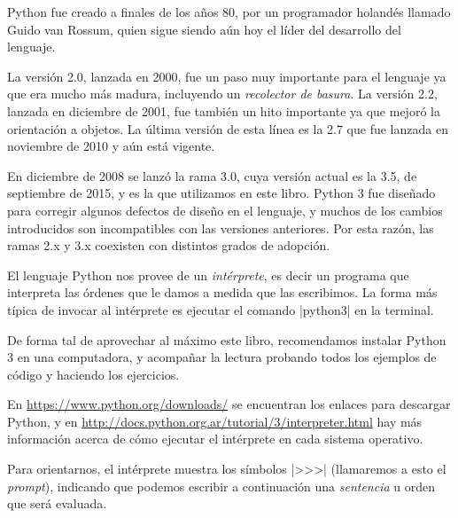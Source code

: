\begin{sabias_que}
Python fue creado a finales de los años 80, por un programador holandés
llamado Guido van Rossum, quien sigue siendo aún hoy el líder del
desarrollo del lenguaje.

La versión 2.0, lanzada en 2000, fue un paso muy importante para el
lenguaje ya que era mucho más madura, incluyendo un \textit{recolector de
basura}.  La versión 2.2, lanzada en diciembre de 2001, fue también un hito
importante ya que mejoró la orientación a objetos.  La última versión de
esta línea es la 2.7 que fue lanzada en noviembre de 2010 y aún está vigente.

En diciembre de 2008 se lanzó la rama 3.0, cuya versión actual es la 3.5, de
septiembre de 2015, y es la que utilizamos en este libro. Python 3 fue diseñado
para corregir algunos defectos de diseño en el lenguaje, y muchos de los
cambios introducidos son incompatibles con las versiones anteriores. Por esta
razón, las ramas 2.x y 3.x coexisten con distintos grados de adopción.
\end{sabias_que}

El lenguaje Python nos provee de un {\it intérprete}, es decir un programa que
interpreta las órdenes que le damos a medida que las escribimos. La forma más
típica de invocar al intérprete es ejecutar el comando |python3| en
la terminal.

\begin{atencion}
De forma tal de aprovechar al máximo este libro, recomendamos instalar Python 3
en una computadora, y acompañar la lectura probando todos los ejemplos de
código y haciendo los ejercicios.

En \url{https://www.python.org/downloads/} se encuentran los enlaces para
descargar Python, y en
\url{http://docs.python.org.ar/tutorial/3/interpreter.html} hay más información
acerca de cómo ejecutar el intérprete en cada sistema operativo.
\end{atencion}


Para orientarnos, el intérprete muestra los símbolos |>>>| (llamaremos a esto
el {\it prompt}), indicando que podemos escribir a continuación una {\it
sentencia} u orden que será evaluada.

